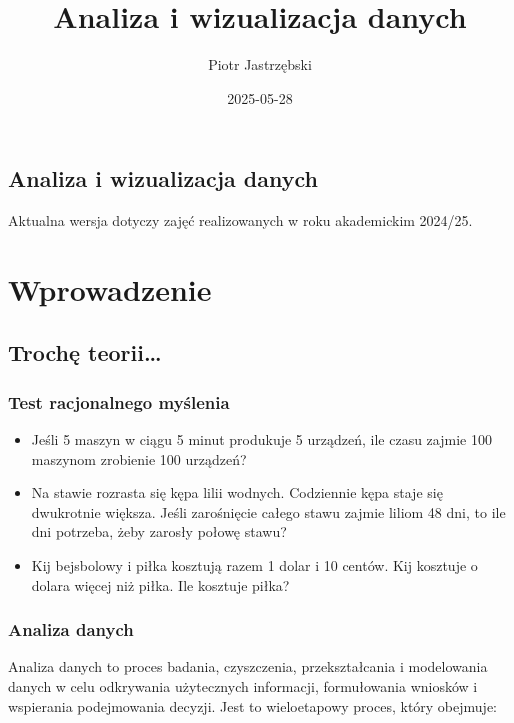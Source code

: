 \documentclass[
  polish,
  letterpaper,
  DIV=11,
  numbers=noendperiod]{scrreprt}
\title{Analiza i wizualizacja danych}
\author{Piotr Jastrzębski}
\date{2025-05-28}
\providecommand{\tightlist}{%
  \setlength{\itemsep}{0pt}\setlength{\parskip}{0pt}}
\renewcommand*\contentsname{Spis treści}
\newcommand\contentsname{Spis treści}
\begin{document}
\maketitle

\renewcommand*\contentsname{Spis treści}
{
\hypersetup{linkcolor=}
\setcounter{tocdepth}{2}
\tableofcontents
}

\chapter{Analiza i wizualizacja
danych}\label{analiza-i-wizualizacja-danych}

Aktualna wersja dotyczy zajęć realizowanych w roku akademickim 2024/25.

\part{Wprowadzenie}

\chapter{Trochę teorii\ldots{}}\label{trochux119-teorii}

\section{Test racjonalnego
myślenia}\label{test-racjonalnego-myux15blenia}

\begin{itemize}
\tightlist
\item
  Jeśli 5 maszyn w ciągu 5 minut produkuje 5 urządzeń, ile czasu zajmie
  100 maszynom zrobienie 100 urządzeń?
\item
  Na stawie rozrasta się kępa lilii wodnych. Codziennie kępa staje się
  dwukrotnie większa. Jeśli zarośnięcie całego stawu zajmie liliom 48
  dni, to ile dni potrzeba, żeby zarosły połowę stawu?
\item
  Kij bejsbolowy i piłka kosztują razem 1 dolar i 10 centów. Kij
  kosztuje o dolara więcej niż piłka. Ile kosztuje piłka?
\end{itemize}

\section{Analiza danych}\label{analiza-danych}

Analiza danych to proces badania, czyszczenia, przekształcania i
modelowania danych w celu odkrywania użytecznych informacji,
formułowania wniosków i wspierania podejmowania decyzji. Jest to
wieloetapowy proces, który obejmuje:
\end{document}

